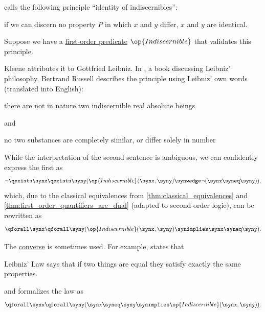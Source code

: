 \begin{remark}\label{rem:identity_of_indiscernibles}
   calls the following principle \enquote{identity of indiscernibles}:
  \begin{displayquote}
    \textellipsis if we can discern no property \( P \) in which \( x \) and \( y \) differ, \( x \) and \( y \) are identical.
  \end{displayquote}

  Suppose we have a \hyperref[def:fol_signature]{first-order predicate} \( \op{Indiscernible} \) that validates this principle.

  Kleene attributes it to Gottfried Leibniz. In \cite[54]{Russell1900LeibnizPhilosophy}, a book discussing Leibniz' philosophy, Bertrand Russell describes the principle using Leibniz' own words (translated into English):
  \begin{displayquote}
    \textellipsis there are not in nature two indiscernible real absolute beings
  \end{displayquote}
  and
  \begin{displayquote}
    \textellipsis no two substances are completely similar, or differ solely in number
  \end{displayquote}

  While the interpretation of the second sentence is ambiguous, we can confidently express the first as
  \begin{equation*}
    \neg \qexists \synx \qexists \syny (\op{Indiscernible}(\synx, \syny) \synwedge \neg (\synx \syneq \syny)),
  \end{equation*}
  which, due to the classical equivalences from \cref{thm:classical_equivalences} and \cref{thm:first_order_quantifiers_are_dual} (adapted to second-order logic), can be rewritten as
  \begin{equation}\label{eq:rem:identity_of_indiscernibles/forward}
    \qforall \synx \qforall \syny (\op{Indiscernible}(\synx, \syny) \synimplies \synx \syneq \syny).
  \end{equation}

  The \hyperref[def:conditional_formula/converse]{converse} is sometimes used. For example,  states that
  \begin{displayquote}
    Leibniz' Law says that if two things are equal they satisfy exactly the same properties.
  \end{displayquote}
  and formalizes the law as
  \begin{equation}\label{eq:rem:identity_of_indiscernibles/backward}
    \qforall \synx \qforall \syny (\synx \syneq \syny \synimplies \op{Indiscernible}(\synx, \syny)).
  \end{equation}


\end{remark}

